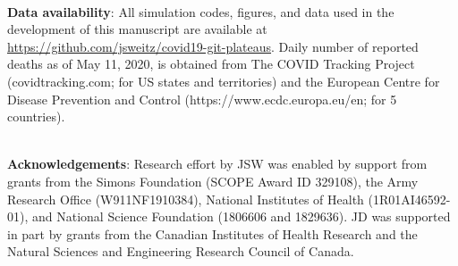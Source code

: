 \mbox{}\\
\noindent
\textbf{Data availability}:
All simulation codes, figures, and data used in the development of this manuscript are available at \url{https://github.com/jsweitz/covid19-git-plateaus}.
Daily number of reported deaths as of May 11, 2020, is obtained from The COVID Tracking Project (covidtracking.com; for US states and territories) and the European Centre for Disease Prevention and Control (https://www.ecdc.europa.eu/en; for 5 countries).

\mbox{}\\
\noindent
\textbf{Acknowledgements}:
Research effort by JSW was enabled
by support from grants from the Simons Foundation (SCOPE Award ID 329108), the Army Research 
Office (W911NF1910384), National Institutes of Health (1R01AI46592-01), 
and National Science Foundation (1806606 and 1829636). JD was supported in part by 
grants from the Canadian Institutes of Health Research and the Natural Sciences and Engineering Research Council of Canada.
